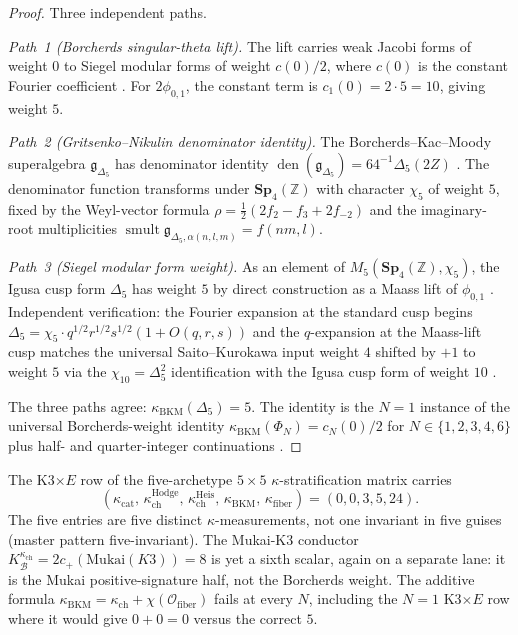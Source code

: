 \documentclass[11pt]{memoir}
\providecommand{\smult}{\operatorname{smult}}
\providecommand{\BKM}{\operatorname{BKM}}
\providecommand{\cO}{\mathcal{O}}
\providecommand{\bZ}{\mathbb{Z}}
\providecommand{\fg}{\mathfrak{g}}
\providecommand{\Sp}{\mathbf{Sp}}
\begin{document}
\begin{proof}
Three independent paths.

\emph{Path~1 (Borcherds singular-theta lift).} The lift carries weak
Jacobi forms of weight $0$ to Siegel modular forms of weight $c(0)/2$,
where $c(0)$ is the constant Fourier coefficient
\cite[Thm.~13.3]{Borcherds1995}. For $2\phi_{0,1}$, the constant term
is $c_1(0) = 2 \cdot 5 = 10$, giving weight $5$.

\emph{Path~2 (Gritsenko--Nikulin denominator identity).} The
Borcherds--Kac--Moody superalgebra $\fg_{\Delta_5}$ has denominator
identity $\operatorname{den}(\fg_{\Delta_5}) = 64^{-1}\Delta_5(2Z)$
\cite[\S2]{GritsenkoNikulin1998}. The denominator function transforms
under $\Sp_4(\bZ)$ with character $\chi_5$ of weight $5$, fixed by the
Weyl-vector formula
$\rho = \tfrac12(2 f_2 - f_3 + 2 f_{-2})$ and the imaginary-root
multiplicities
$\smult \fg_{\Delta_5,\alpha(n,l,m)} = f(nm,l)$.

\emph{Path~3 (Siegel modular form weight).} As an element of
$M_5(\Sp_4(\bZ), \chi_5)$, the Igusa cusp form $\Delta_5$ has weight
$5$ by direct construction as a Maass lift of $\phi_{0,1}$
\cite{Igusa1962, EichlerZagier1985}. Independent verification: the
Fourier expansion at the standard cusp begins
$\Delta_5 = \chi_5 \cdot q^{1/2} r^{1/2} s^{1/2} (1 + O(q,r,s))$ and
the $q$-expansion at the Maass-lift cusp matches the universal
Saito--Kurokawa input weight $4$ shifted by $+1$ to weight $5$ via the
$\chi_{10} = \Delta_5^2$ identification with the Igusa cusp form of
weight $10$ \cite[\S6]{EichlerZagier1985}.

The three paths agree: $\kappa_{\BKM}(\Delta_5) = 5$. The identity is
the $N = 1$ instance of the universal Borcherds-weight identity
$\kappa_{\BKM}(\Phi_N) = c_N(0)/2$ for $N \in \{1, 2, 3, 4, 6\}$ plus
half- and quarter-integer continuations \cite[Vol.~III, FRONTIER \S
``Universal Borcherds-weight identity'']{LorgatVol3}.
\end{proof}

\begin{remark}
\label{rem:borcherds-weight-vs-chiral}
The K3$\times E$ row of the five-archetype $5\times 5$
$\kappa$-stratification matrix carries
\[
  (\kappa_{\mathrm{cat}},\,
   \kappa_{\mathrm{ch}}^{\mathrm{Hodge}},\,
   \kappa_{\mathrm{ch}}^{\mathrm{Heis}},\,
   \kappa_{\BKM},\,
   \kappa_{\mathrm{fiber}})
  = (0, 0, 3, 5, 24).
\]
The five entries are five distinct $\kappa$-measurements, not one
invariant in five guises (master pattern five-invariant). The Mukai-K3 conductor
$K^{\kappa_{\mathrm{ch}}}_{\mathcal B} = 2 c_+(\mathrm{Mukai}(K3)) = 8$
is yet a sixth scalar, again on a separate lane: it is the Mukai
positive-signature half, not the Borcherds weight. The additive
formula $\kappa_{\BKM} = \kappa_{\mathrm{ch}} +
\chi(\cO_{\mathrm{fiber}})$ fails at every $N$, including the
$N=1$ K3$\times E$ row where it would give $0 + 0 = 0$ versus the
correct $5$.
\end{remark}
\end{document}
